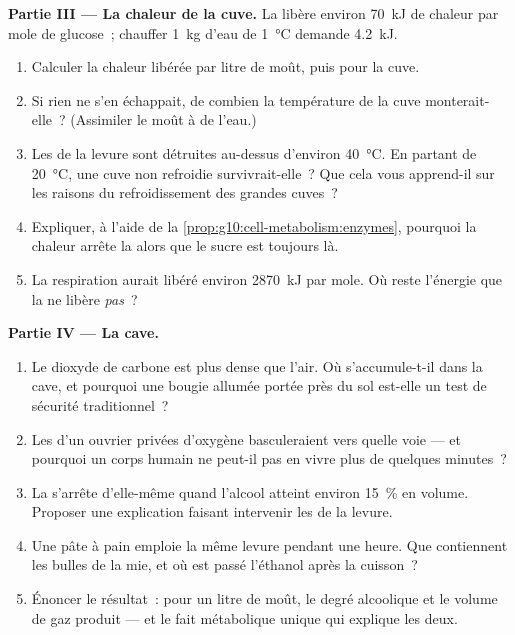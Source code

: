 \begin{problem}
\medskip
\noindent\textbf{Partie III --- La chaleur de la cuve.}
La  libère environ \qty{70}{kJ} de chaleur par mole de
glucose~; chauffer \qty{1}{kg} d'eau de \qty{1}{\celsius} demande
\qty{4.2}{kJ}.
\begin{enumerate}[resume]
  \item Calculer la chaleur libérée par litre de moût, puis pour la
        cuve.
  \item Si rien ne s'en échappait, de combien la température de la
        cuve monterait-elle~? (Assimiler le moût à de l'eau.)
  \item Les  de la levure sont détruites au-dessus d'environ
        \qty{40}{\celsius}. En partant de \qty{20}{\celsius}, une cuve
        non refroidie survivrait-elle~? Que cela vous apprend-il sur
        les raisons du refroidissement des grandes cuves~?
  \item Expliquer, à l'aide de la
        \cref{prop:g10:cell-metabolism:enzymes}, pourquoi la chaleur
        arrête la  alors que le sucre est toujours là.
  \item La respiration aurait libéré environ \qty{2870}{kJ} par mole.
        Où reste l'énergie que la  ne libère \emph{pas}~?
\end{enumerate}

\medskip
\noindent\textbf{Partie IV --- La cave.}
\begin{enumerate}[resume]
  \item Le dioxyde de carbone est plus dense que l'air. Où
        s'accumule-t-il dans la cave, et pourquoi une bougie allumée
        portée près du sol est-elle un test de sécurité
        traditionnel~?
  \item Les  d'un ouvrier privées d'oxygène basculeraient vers
        quelle voie --- et pourquoi un corps humain ne peut-il pas en
        vivre plus de quelques minutes~?
  \item La  s'arrête d'elle-même quand l'alcool atteint
        environ 15~\% en volume. Proposer une explication faisant
        intervenir les  de la levure.
  \item Une pâte à pain emploie la même levure pendant une heure. Que
        contiennent les bulles de la mie, et où est passé l'éthanol
        après la cuisson~?
  \item Énoncer le résultat~: pour un litre de moût, le degré
        alcoolique et le volume de gaz produit --- et le fait
        métabolique unique qui explique les deux.
\end{enumerate}
\end{problem}
